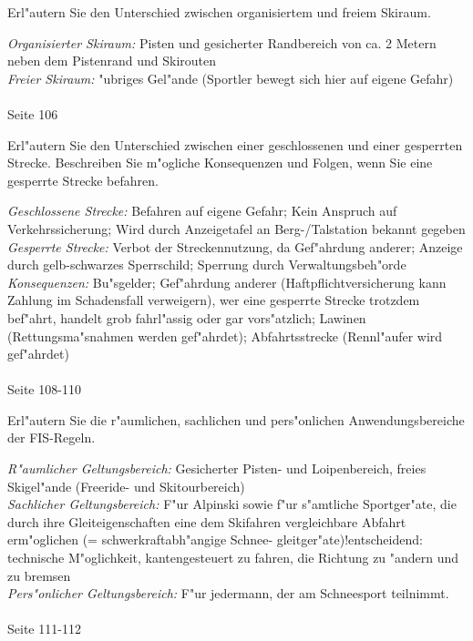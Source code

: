 \begin{question}{3}
Erl"autern Sie den Unterschied zwischen organisiertem und freiem Skiraum.
\end{question}
\begin{solution}
\emph{Organisierter Skiraum:} Pisten und gesicherter Randbereich von ca. 2 Metern neben dem Pistenrand und Skirouten\\
\emph{Freier Skiraum:} "ubriges Gel"ande (Sportler bewegt sich hier auf eigene Gefahr)\\\\
 Seite 106
\end{solution}

\begin{question}{4}
Erl"autern Sie den Unterschied zwischen einer geschlossenen und einer gesperrten Strecke. Beschreiben Sie m"ogliche Konsequenzen und Folgen, wenn Sie eine gesperrte Strecke befahren.
\end{question}
\begin{solution}
\emph{Geschlossene Strecke:} Befahren auf eigene Gefahr; Kein Anspruch auf Verkehrssicherung; Wird durch Anzeigetafel an Berg-/Talstation bekannt gegeben\\
\emph{Gesperrte Strecke:} Verbot der Streckennutzung, da Gef"ahrdung anderer; Anzeige durch gelb-schwarzes Sperrschild; Sperrung durch Verwaltungsbeh"orde\\
\emph{Konsequenzen:} Bu"sgelder; Gef"ahrdung anderer (Haftpflichtversicherung kann Zahlung im Schadensfall verweigern), wer eine gesperrte Strecke trotzdem bef"ahrt, handelt grob fahrl"assig oder gar vors"atzlich; Lawinen (Rettungsma"snahmen werden gef"ahrdet); Abfahrtsstrecke (Rennl"aufer wird gef"ahrdet)\\\\
 Seite 108-110
\end{solution}

\begin{question}{3}
Erl"autern Sie die r"aumlichen, sachlichen und pers"onlichen Anwendungsbereiche der FIS-Regeln.
\end{question}
\begin{solution}
\emph{R"aumlicher Geltungsbereich:} Gesicherter Pisten- und Loipenbereich, freies Skigel"ande (Freeride- und Skitourbereich)\\
\emph{Sachlicher Geltungsbereich:} F"ur Alpinski sowie f"ur s"amtliche Sportger"ate, die durch ihre Gleiteigenschaften eine dem Skifahren vergleichbare Abfahrt erm"oglichen (= schwerkraftabh"angige Schnee- gleitger"ate)!entscheidend: technische M"oglichkeit, kantengesteuert zu fahren, die Richtung zu "andern und zu bremsen\\
\emph{Pers"onlicher Geltungsbereich:} F"ur jedermann, der am Schneesport teilnimmt.\\\\
 Seite 111-112
\end{solution}

